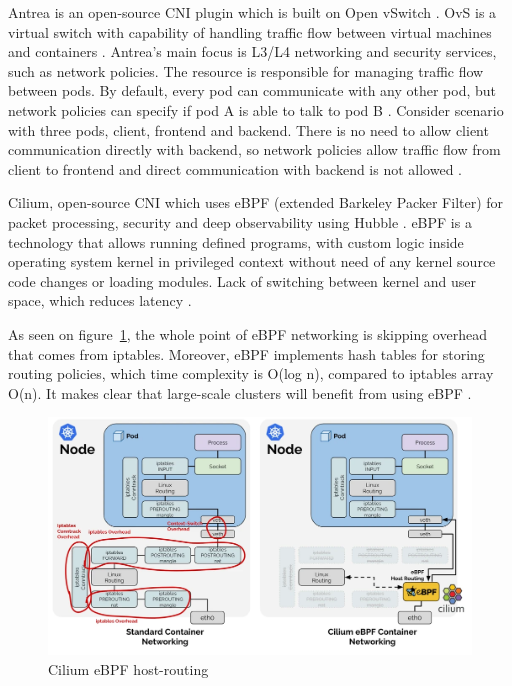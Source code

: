 Antrea is an open-source CNI plugin which is built on Open vSwitch \cite{Antrea}. OvS is a virtual switch with capability of handling traffic flow between virtual machines and containers \cite{OvS}. Antrea's main focus is L3/L4 networking and security services, such as network policies. The resource is responsible for managing traffic flow between pods. By default, every pod can communicate with any other pod, but network policies can specify if pod A is able to talk to pod B \cite{KubernetesNetworkPolicies}. Consider scenario with three pods, client, frontend and backend. There is no need to allow client communication directly with backend, so network policies allow traffic flow from client to frontend and direct communication with backend is not allowed \cite{CalicoNetworkPolicies}. 


Cilium, open-source CNI which uses eBPF (extended Barkeley Packer Filter) for packet processing, security and deep observability using Hubble \cite{CiliumOverview}. eBPF is a technology that allows running defined programs, with custom logic inside operating system kernel in privileged context without need of any kernel source code changes or loading modules. Lack of switching between kernel and user space, which reduces latency \cite{eBPF}. 

As seen on figure~\ref{fig:ebpf_routing}, the whole point of eBPF networking is skipping overhead that comes from iptables. Moreover, eBPF implements hash tables for storing routing policies, which time complexity is O(log n), compared to iptables array O(n). It makes clear that large-scale clusters will benefit from using eBPF \cite{IsovalentHash}. 

\begin{figure}[H]
    \centering
    \includegraphics[width=0.9\columnwidth]{images/ebpf_hostrouting.png}
    \caption{Cilium eBPF host-routing \cite{CiliumCNIBenchmark}}
    \label{fig:ebpf_routing}
\end{figure}



